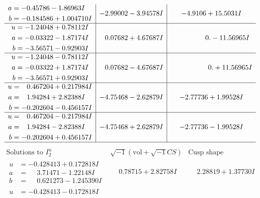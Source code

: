 \documentclass[1p]{elsarticle_modified}
\theoremstyle{definition}
\newcommand{\I}{\sqrt{-1}}
\begin{document}
$$\begin{array}{c|c|c}
\begin{aligned}
a &= -0.45786 - 1.86963 I \\
b &= -0.184586 + 1.004710 I\end{aligned}
 & -2.99002 - 3.94578 I & -4.9106 + 15.5031 I \\ \hline\begin{aligned}
u &= -1.24048 + 0.78112 I \\
a &= -0.03322 - 1.87174 I \\
b &= -3.56571 - 0.92903 I\end{aligned}
 & \phantom{-}0.07682 + 4.67687 I & \phantom{-0.000000 } 0. - 11.56965 I \\ \hline\begin{aligned}
u &= -1.24048 - 0.78112 I \\
a &= -0.03322 + 1.87174 I \\
b &= -3.56571 + 0.92903 I\end{aligned}
 & \phantom{-}0.07682 - 4.67687 I & \phantom{-0.000000 -}0. + 11.56965 I \\ \hline\begin{aligned}
u &= \phantom{-}0.467204 + 0.217984 I \\
a &= \phantom{-}1.94284 + 2.82388 I \\
b &= -0.202604 - 0.456157 I\end{aligned}
 & -4.75468 - 2.62879 I & -2.77736 + 1.99528 I \\ \hline\begin{aligned}
u &= \phantom{-}0.467204 - 0.217984 I \\
a &= \phantom{-}1.94284 - 2.82388 I \\
b &= -0.202604 + 0.456157 I\end{aligned}
 & -4.75468 + 2.62879 I & -2.77736 - 1.99528 I\\
 \hline 
 \end{array}$$\newpage$$\begin{array}{c|c|c}  
\text{Solutions to }I^u_{2}& \I (\text{vol} + \sqrt{-1}CS) & \text{Cusp shape}\\
 \hline 
\begin{aligned}
u &= -0.428413 + 0.172818 I \\
a &= \phantom{-}3.71471 - 1.22148 I \\
b &= \phantom{-}0.621273 - 1.245390 I\end{aligned}
 & \phantom{-}0.78715 + 2.82758 I & \phantom{-}2.28819 + 1.37730 I \\ \hline\begin{aligned}
u &= -0.428413 - 0.172818 I \\

\end{aligned}
\end{array}$$
\end{document}
